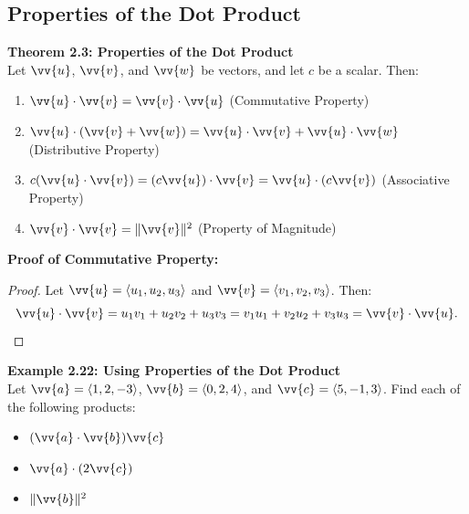 \documentclass{article}
\begin{document}
\subsection*{Properties of the Dot Product}

\begin{theorembox}
    \textbf{Theorem 2.3: Properties of the Dot Product} \\
    Let \(\vv{u}\), \(\vv{v}\), and \(\vv{w}\) be vectors, and let \(c\) be a scalar. Then:
    \begin{enumerate}
        \item \(\vv{u} \cdot \vv{v} = \vv{v} \cdot \vv{u}\) \quad (Commutative Property)
        \item \(\vv{u} \cdot (\vv{v} + \vv{w}) = \vv{u} \cdot \vv{v} + \vv{u} \cdot \vv{w}\) \quad (Distributive Property)
        \item \(c(\vv{u} \cdot \vv{v}) = (c\vv{u}) \cdot \vv{v} = \vv{u} \cdot (c\vv{v})\) \quad (Associative Property)
        \item \(\vv{v} \cdot \vv{v} = \|\vv{v}\|^2\) \quad (Property of Magnitude)
    \end{enumerate}
\end{theorembox}

\begin{proofbox}
    \textbf{Proof of Commutative Property:}
    \begin{proof}
    Let \(\vv{u} = \langle u_1, u_2, u_3 \rangle\) and \(\vv{v} = \langle v_1, v_2, v_3 \rangle\). Then:
    \[
    \vv{u} \cdot \vv{v} = u_1 v_1 + u_2 v_2 + u_3 v_3 = v_1 u_1 + v_2 u_2 + v_3 u_3 = \vv{v} \cdot \vv{u}.
    \]
    \end{proof}
\end{proofbox}

\begin{examplebox}
    \textbf{Example 2.22: Using Properties of the Dot Product} \\
    Let \(\vv{a} = \langle 1, 2, -3 \rangle\), \(\vv{b} = \langle 0, 2, 4 \rangle\), and \(\vv{c} = \langle 5, -1, 3 \rangle\). Find each of the following products:
    \begin{itemize}
        \item \((\vv{a} \cdot \vv{b}) \vv{c}\)
        \item \(\vv{a} \cdot (2\vv{c})\)
        \item \(\|\vv{b}\|^2\)
    \end{itemize}
\end{examplebox}
\end{document}
